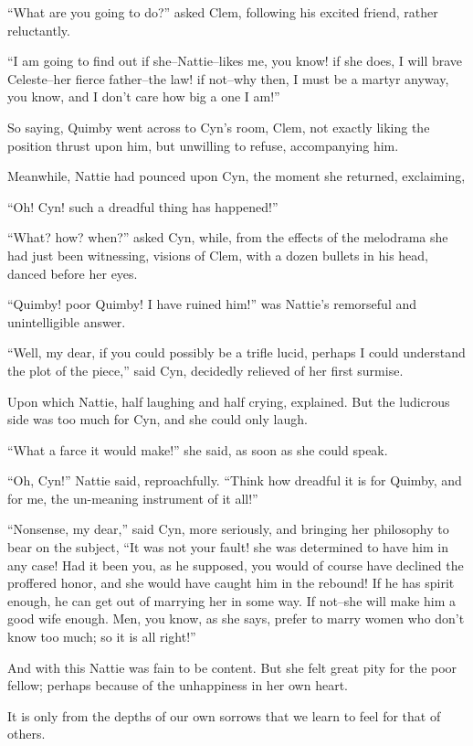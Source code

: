 ``What are you going to do?'' asked Clem, following his excited friend,
rather reluctantly.

``I am going to find out if she--Nattie--likes me, you know! if she does,
I will brave Celeste--her fierce father--the law! if not--why then, I
must be a martyr anyway, you know, and I don't care how big a one I am!''

So saying, Quimby went across to Cyn's room, Clem, not exactly liking
the position thrust upon him, but unwilling to refuse, accompanying him.

Meanwhile, Nattie had pounced upon Cyn, the moment she returned,
exclaiming,

``Oh! Cyn! such a dreadful thing has happened!''

``What? how? when?'' asked Cyn, while, from the effects of the melodrama
she had just been witnessing, visions of Clem, with a dozen bullets in
his head, danced before her eyes.

``Quimby! poor Quimby! I have ruined him!'' was Nattie's remorseful and
unintelligible answer.

``Well, my dear, if you could possibly be a trifle lucid, perhaps I could
understand the plot of the piece,'' said Cyn, decidedly relieved of her
first surmise.

Upon which Nattie, half laughing and half crying, explained. But the
ludicrous side was too much for Cyn, and she could only laugh.

``What a farce it would make!'' she said, as soon as she could speak.

``Oh, Cyn!'' Nattie said, reproachfully. ``Think how dreadful it is for
Quimby, and for me, the un-meaning instrument of it all!''

``Nonsense, my dear,'' said Cyn, more seriously, and bringing her
philosophy to bear on the subject, ``It was not your fault! she was
determined to have him in any case! Had it been you, as he supposed, you
would of course have declined the proffered honor, and she would have
caught him in the rebound! If he has spirit enough, he can get out of
marrying her in some way. If not--she will make him a good wife enough.
Men, you know, as she says, prefer to marry women who don't know too
much; so it is all right!''

And with this Nattie was fain to be content. But she felt great pity for
the poor fellow; perhaps because of the unhappiness in her own heart.

It is only from the depths of our own sorrows that we learn to feel for
that of others.

